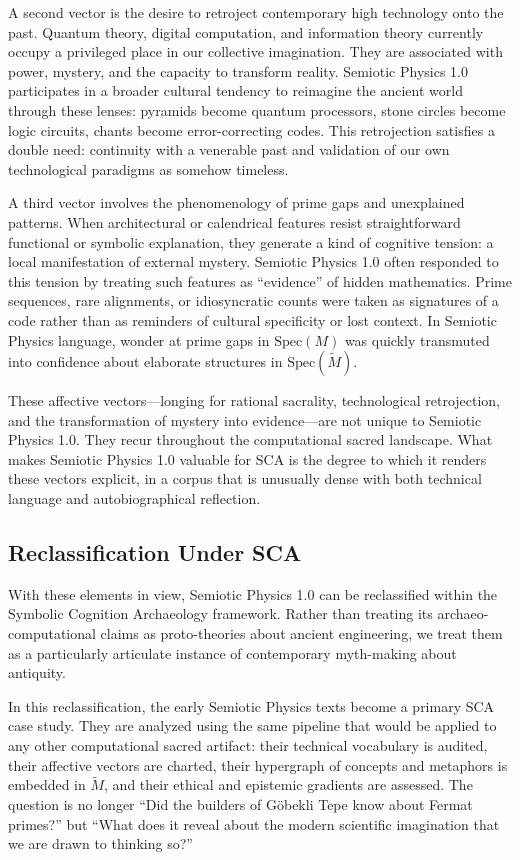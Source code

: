 \documentclass[12]{amsart}
\theoremstyle{plain}
\begin{document}
A second vector is the desire to retroject contemporary high technology onto the past. Quantum theory, digital computation, and information theory currently occupy a privileged place in our collective imagination. They are associated with power, mystery, and the capacity to transform reality. Semiotic Physics 1.0 participates in a broader cultural tendency to reimagine the ancient world through these lenses: pyramids become quantum processors, stone circles become logic circuits, chants become error-correcting codes. This retrojection satisfies a double need: continuity with a venerable past and validation of our own technological paradigms as somehow timeless.

A third vector involves the phenomenology of prime gaps and unexplained patterns. When architectural or calendrical features resist straightforward functional or symbolic explanation, they generate a kind of cognitive tension: a local manifestation of external mystery. Semiotic Physics 1.0 often responded to this tension by treating such features as ``evidence'' of hidden mathematics. Prime sequences, rare alignments, or idiosyncratic counts were taken as signatures of a code rather than as reminders of cultural specificity or lost context. In Semiotic Physics language, wonder at prime gaps in $\mathrm{Spec}(M)$ was quickly transmuted into confidence about elaborate structures in $\mathrm{Spec}(\tilde M)$.

These affective vectors---longing for rational sacrality, technological retrojection, and the transformation of mystery into evidence---are not unique to Semiotic Physics 1.0. They recur throughout the computational sacred landscape. What makes Semiotic Physics 1.0 valuable for SCA is the degree to which it renders these vectors explicit, in a corpus that is unusually dense with both technical language and autobiographical reflection.

\subsection{Reclassification Under SCA}

With these elements in view, Semiotic Physics 1.0 can be reclassified within the Symbolic Cognition Archaeology framework. Rather than treating its archaeo-computational claims as proto-theories about ancient engineering, we treat them as a particularly articulate instance of contemporary myth-making about antiquity.

In this reclassification, the early Semiotic Physics texts become a primary SCA case study. They are analyzed using the same pipeline that would be applied to any other computational sacred artifact: their technical vocabulary is audited, their affective vectors are charted, their hypergraph of concepts and metaphors is embedded in $\tilde M$, and their ethical and epistemic gradients are assessed. The question is no longer ``Did the builders of Göbekli Tepe know about Fermat primes?'' but ``What does it reveal about the modern scientific imagination that we are drawn to thinking so?''
\end{document}
